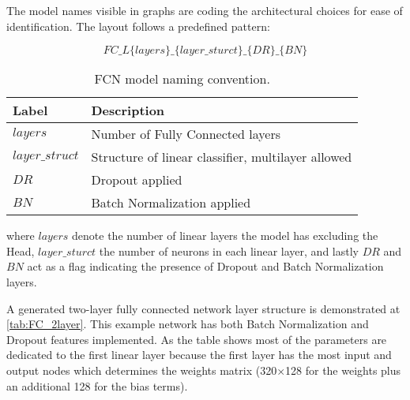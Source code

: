 The model names visible in graphs are coding the architectural choices for ease of identification. The layout follows a predefined pattern:

\begin{equation*}
FC\_L\{layers\}\_\{layer\_sturct\}\_\{DR\}\_\{BN\}
\end{equation*}


\begin{table}[h!]
\begin{tabular}{l|l}
\textbf{Label}      & \textbf{Description}  \\
\hline
$layers$     & Number of Fully Connected layers \\
$layer\_struct$ & Structure of linear classifier, multilayer allowed \\
$DR$         & Dropout applied           \\
$BN$         & Batch Normalization applied           
\end{tabular}
\caption{FCN model naming convention.}
\end{table}


where $layers$ denote the number of linear layers the model has excluding the Head, $layer\_sturct$ the number of neurons in each linear layer, and lastly $DR$ and $BN$ act as a flag indicating the presence of Dropout and Batch Normalization layers.

A generated two-layer fully connected network layer structure is demonstrated at \autoref{tab:FC_2layer}. This example network has both Batch Normalization and Dropout features implemented. As the table shows most of the parameters are dedicated to the first linear layer because the first layer has the most input and output nodes which determines the weights matrix (320$\times$128 for the weights plus an additional 128 for the bias terms).

